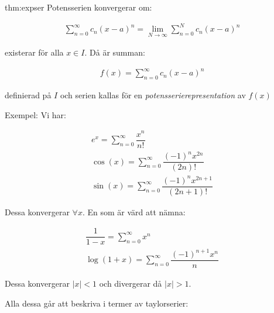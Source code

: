 \begin{theo}[Potensserie]{thm:expser}
\noindent Potensserien konvergerar om:

\begin{equation*}
  \begin{gathered}
    \sum_{n=0}^{\infty}c_n(x-a)^n = \lim_{N\to\infty}\sum_{n=0}^{N}c_n(x-a)^n
  \end{gathered}
\end{equation*}
\par\bigskip
\noindent existerar för alla $x\in I$. Då är summan:

\begin{equation*}
  \begin{gathered}
    f(x) = \sum_{n=0}^{\infty}c_n(x-a)^n
  \end{gathered}
\end{equation*}
\par\bigskip
\noindent definierad på $I$ och serien kallas för en \textit{potensserierepresentation} av $f(x)$
\end{theo}
\par\bigskip
\noindent Exempel: Vi har:


\begin{equation*}
  \begin{gathered}
    e^x = \sum_{n=0}^{\infty}\dfrac{x^n}{n!}\\
    \cos(x) = \sum_{n=0}^{\infty}\dfrac{(-1)^nx^{2n}}{(2n)!}\\
    \sin(x) = \sum_{n=0}^{\infty}\dfrac{(-1)^nx^{2n+1}}{(2n+1)!}
  \end{gathered}
\end{equation*}
\par\bigskip
\noindent Dessa konvergerar $\forall x$. En som är värd att nämna:


\begin{equation*}
  \begin{gathered}
    \dfrac{1}{1-x} = \sum_{n=0}^{\infty}x^n\\
    \log(1+x)=\sum_{n=0}^{\infty}\dfrac{(-1)^{n+1}x^n}{n}
  \end{gathered}
\end{equation*}
\par\bigskip
\noindent Dessa konvergerar $\left|x\right|<1$ och divergerar då $\left|x\right|>1$.
\par\bigskip
\noindent Alla dessa går att beskriva i termer av taylorserier:
\par\bigskip

